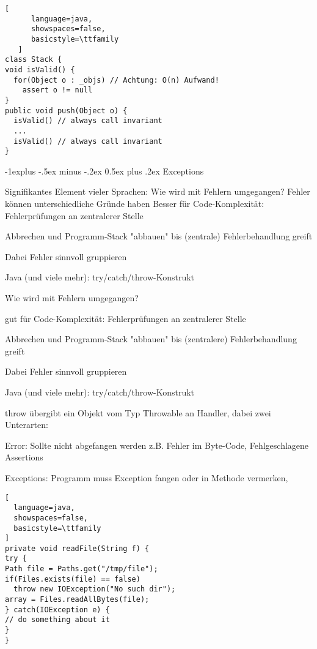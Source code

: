 \documentclass[10pt]{article}
\makeatletter
\renewcommand{\subsection}{\@startsection{subsection}{2}{0mm}%
                                {-1explus -.5ex minus -.2ex}%
                                {0.5ex plus .2ex}%
                                {\normalfont\normalsize\bfseries}}
\makeatother
\begin{document}
\begin{itemize*}
\begin{lstlisting}[
      language=java,
      showspaces=false,
      basicstyle=\ttfamily
   ]
class Stack {
void isValid() {
  for(Object o : _objs) // Achtung: O(n) Aufwand!
    assert o != null
}
public void push(Object o) {
  isValid() // always call invariant
  ...
  isValid() // always call invariant
}
\end{lstlisting}


\subsection{Exceptions}

Signifikantes Element vieler Sprachen: Wie wird mit Fehlern umgegangen?
Fehler können unterschiedliche Gründe haben
Besser für Code-Komplexität: Fehlerprüfungen an zentralerer Stelle
\begin{itemize*}
  \item Abbrechen und Programm-Stack "abbauen" bis (zentrale) Fehlerbehandlung greift
  \item Dabei Fehler sinnvoll gruppieren
  \item Java (und viele mehr): try/catch/throw-Konstrukt
\end{itemize*}

\begin{itemize*}
  \item Wie wird mit Fehlern umgegangen?
  \item gut für Code-Komplexität: Fehlerprüfungen an zentralerer Stelle
  \begin{itemize*}
    \item Abbrechen und Programm-Stack "abbauen" bis (zentralere) Fehlerbehandlung greift
    \item Dabei Fehler sinnvoll gruppieren
  \end{itemize*}
  \item Java (und viele mehr): try/catch/throw-Konstrukt
  \begin{itemize*}
    \item throw übergibt ein Objekt vom Typ Throwable an Handler, dabei zwei Unterarten:
    \item Error: Sollte nicht abgefangen werden z.B. Fehler im Byte-Code, Fehlgeschlagene Assertions
    \item Exceptions: Programm muss Exception fangen oder in Methode vermerken,
  \end{itemize*}
\end{itemize*}

\begin{lstlisting}[
  language=java,
  showspaces=false,
  basicstyle=\ttfamily
]
private void readFile(String f) {
try {
Path file = Paths.get("/tmp/file");
if(Files.exists(file) == false)
  throw new IOException("No such dir");
array = Files.readAllBytes(file);
} catch(IOException e) {
// do something about it
}
}
\end{lstlisting}



\end{itemize*}
\end{document}
